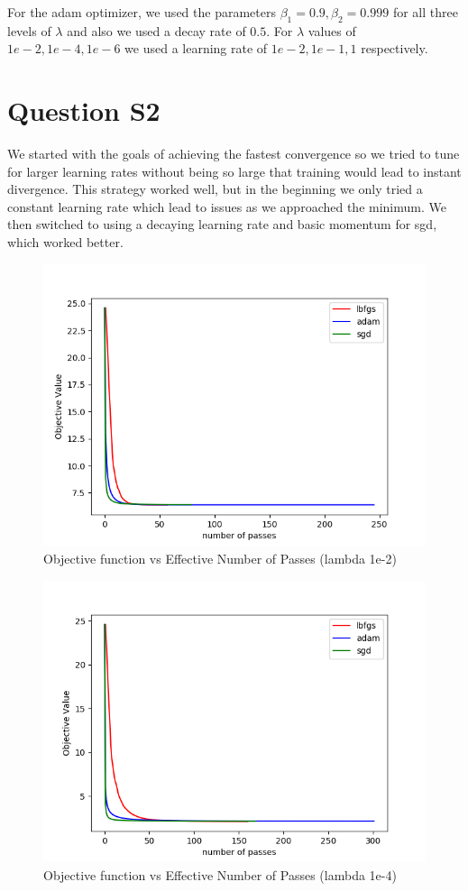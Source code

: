 \documentclass[11pt]{report}
\begin{document}
For the adam optimizer, we used the 
parameters $\beta_1 = 0.9, \beta_2 = 0.999$ for all three levels of $\lambda$ and 
also we used a decay rate of $0.5$. For $\lambda$ values of $1e-2, 1e-4, 1e-6$ 
we used a learning rate of $1e-2, 1e-1, 1$ respectively.

\section*{Question S2}
We started with the goals of achieving the fastest convergence so we tried to
tune for larger learning rates without being so large that training would lead
to instant divergence. This strategy worked well, but in the beginning we only
tried a constant learning rate which lead to issues as we approached the minimum.
We then switched to using a decaying learning rate and basic momentum for sgd, which
worked better.

\begin{figure}[b]
\centering
\includegraphics[scale=0.4]{objval_ef_1e2.png}
\caption{Objective function vs Effective Number of Passes (lambda 1e-2)}
\end{figure}

\begin{figure}[b]
\centering
\includegraphics[scale=0.4]{objval_ef_1e4.png}
\caption{Objective function vs Effective Number of Passes (lambda 1e-4)}
\end{figure}
\end{document}
